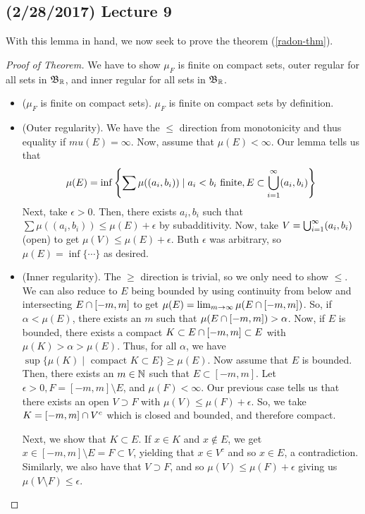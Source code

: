 \documentclass[11pt,leqno,oneside]{amsbook}
\numberwithin{thm}{section}
\begin{document}
  \subsection*{(2/28/2017) Lecture 9}
  With this lemma in hand, we now seek to prove the theorem (\ref{radon-thm}).
  \begin{proof}[Proof of Theorem]
    We have to show $\mu_F$ is finite on compact sets, outer
    regular for all sets in $\mathfrak{B}_{\mathbb R}$, and inner regular for all sets in
    $\mathfrak{B}_{\mathbb R}$.
    \begin{itemize}
    \item ($\mu_F$ is finite on compact sets). 
      $\mu_F$ is finite on compact sets by definition.
    \item (Outer regularity). We have the $\leq$ direction from
      monotonicity and thus equality if $mu(E) = \infty$. Now, assume
      that $\mu(E) < \infty$. Our lemma tells us that \[
        \mu(E) = \inf \left\{ \sum \mu((a_i,b_i)) \mid a_i < b_i
          \text{ finite}, E \subset \bigcup_{i=1}^\infty (a_i,b_i) \right\}
      \]
      Next, take $\epsilon > 0$. Then, there exists $a_i,b_i$ such
      that $\sum \mu((a_i,b_i)) \leq \mu(E) +\epsilon$ by
      subadditivity. Now, take $V = \bigcup_{i=1}^\infty (a_i,b_i)$
      (open) to get $\mu(V) \leq \mu(E) + \epsilon$. Buth $\epsilon$
      was arbitrary, so $\mu(E) = \inf\{ \cdots \}$ as desired.
    \item (Inner regularity). The $\geq$ direction is trivial, so we
      only need to show $\leq$. We can also reduce to $E$ being
      bounded by using continuity from below and intersecting $E
      \cap [-m,m]$ to get $\mu(E) = \lim_{m \to \infty} \mu(E
      \cap [-m,m])$. So, if $\alpha < \mu(E)$, there exists an
      $m$ such that $\mu(E \cap [-m,m]) > \alpha$. Now, if $E$
      is bounded, there exists a 
      compact $K \subset E \cap [-m,m] \subset E$ with $\mu(K) >
      \alpha > \mu(E)$. Thus, for all $\alpha$, we have $\sup \{\mu(K)
      \mid \text{ compact }K \subset E\} \geq \mu(E)$. Now assume that
      $E$ is bounded. Then, there exists an $m \in {\mathbb N}$ such that $E
      \subset [-m,m]$. Let $\epsilon > 0, F = [-m,m] \setminus E$, and
      $\mu(F) < \infty$. Our previous case tells us that there exists
      an open $V \supset F$  with $\mu(V) \leq \mu(F) + \epsilon$. So,
      we take $K = [-m,m] \cap V^c$ which is closed and bounded,
      and therefore compact.

      Next, we show that $K
      \subset E$. If $x \in K$ and $x \not \in E$, we get $x \in
      [-m,m] \setminus E = F \subset V$, yielding that $x \in V^c$ and
      so $x \in E$, a contradiction. Similarly, we also have that $V
      \supset F$, and so $\mu(V) \leq \mu(F) + \epsilon$ giving us
      $\mu(V \setminus F) \leq \epsilon$.


\end{itemize}
\end{proof}
\end{document}
